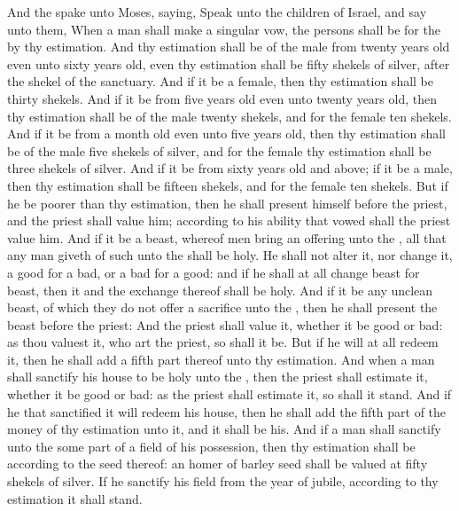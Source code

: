 \begin{biblechapter} %
 And the \LORD spake unto Moses, saying,
\verse Speak unto the children of Israel, and say unto them, When a man shall make a singular vow, the persons shall be for the \LORD by thy estimation.
\verse And thy estimation shall be of the male from twenty years old even unto sixty years old, even thy estimation shall be fifty shekels of silver, after the shekel of the sanctuary.
\verse And if it be a female, then thy estimation shall be thirty shekels.
\verse And if it be from five years old even unto twenty years old, then thy estimation shall be of the male twenty shekels, and for the female ten shekels.
\verse And if it be from a month old even unto five years old, then thy estimation shall be of the male five shekels of silver, and for the female thy estimation shall be three shekels of silver.
\verse And if it be from sixty years old and above; if it be a male, then thy estimation shall be fifteen shekels, and for the female ten shekels.
\verse But if he be poorer than thy estimation, then he shall present himself before the priest, and the priest shall value him; according to his ability that vowed shall the priest value him.
\verse And if it be a beast, whereof men bring an offering unto the \LORD, all that any man giveth of such unto the \LORD shall be holy.
\verse He shall not alter it, nor change it, a good for a bad, or a bad for a good: and if he shall at all change beast for beast, then it and the exchange thereof shall be holy.
\verse And if it be any unclean beast, of which they do not offer a sacrifice unto the \LORD, then he shall present the beast before the priest:
\verse And the priest shall value it, whether it be good or bad: as thou valuest it, who art the priest, so shall it be.
\verse But if he will at all redeem it, then he shall add a fifth part thereof unto thy estimation.
\verse And when a man shall sanctify his house to be holy unto the \LORD, then the priest shall estimate it, whether it be good or bad: as the priest shall estimate it, so shall it stand.
\verse And if he that sanctified it will redeem his house, then he shall add the fifth part of the money of thy estimation unto it, and it shall be his.
\verse And if a man shall sanctify unto the \LORD some part of a field of his possession, then thy estimation shall be according to the seed thereof: an homer of barley seed shall be valued at fifty shekels of silver.
\verse If he sanctify his field from the year of jubile, according to thy estimation it shall stand.

\end{biblechapter}

